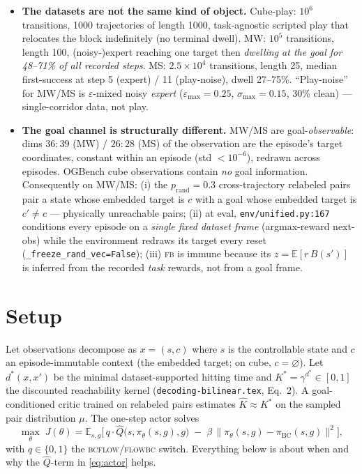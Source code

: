 \documentclass[10pt]{article}
\newcommand{\E}{\mathbb{E}}
\begin{document}
\begin{itemize}
  500k steps, P1-partial moves $0.37\to0.41$ while success moves $65\to93$.
\item[\textbf{E7}] \textbf{The datasets are not the same kind of object.}
  Cube-play: $10^6$ transitions, 1000 trajectories of length 1000, task-agnostic scripted
  play that relocates the block indefinitely (no terminal dwell). MW: $10^5$ transitions,
  length 100, (noisy-)expert reaching one target then \emph{dwelling at the goal for
  48--71\% of all recorded steps}. MS: $2.5{\times}10^4$ transitions, length 25, median
  first-success at step 5 (expert) / 11 (play-noise), dwell 27--75\%. ``Play-noise'' for
  MW/MS is $\varepsilon$-mixed noisy \emph{expert} ($\varepsilon_{\max}=0.25$,
  $\sigma_{\max}=0.15$, 30\% clean) --- single-corridor data, not play.
\item[\textbf{E8}] \textbf{The goal channel is structurally different.} MW/MS are
  goal-\emph{observable}: dims $36{:}39$ (MW) / $26{:}28$ (MS) of the observation are the
  episode's target coordinates, constant within an episode (std $<10^{-6}$), redrawn across
  episodes. OGBench cube observations contain \emph{no} goal information. Consequently on
  MW/MS: (i) the $p_{\mathrm{rand}}=0.3$ cross-trajectory relabeled pairs pair a state whose
  embedded target is $c$ with a goal whose embedded target is $c'\ne c$ --- physically
  unreachable pairs; (ii) at eval, \texttt{env/unified.py:167} conditions every episode on
  a \emph{single fixed dataset frame} (argmax-reward next-obs) while the environment redraws
  its target every reset (\texttt{\_freeze\_rand\_vec=False}); (iii) \textsc{fb} is immune
  because its $z=\E[r\,B(s')]$ is inferred from the recorded \emph{task} rewards, not from a
  goal frame.
\end{itemize}

\section{Setup}

Let observations decompose as $x=(s,c)$ where $s$ is the controllable state and $c$ an
episode-immutable context (the embedded target; on cube, $c=\varnothing$). Let
$d^*(x,x')$ be the minimal dataset-supported hitting time and
$K^*=\gamma^{d^*}\in[0,1]$ the discounted reachability kernel
(\texttt{decoding-bilinear.tex}, Eq.~2). A goal-conditioned critic trained on relabeled
pairs estimates $\hat K\approx K^*$ on the sampled pair distribution $\mu$. The one-step
actor solves
\begin{equation}
\max_\theta\; J(\theta)=\E_{s,g}\Big[\,q\cdot \hat Q\big(s,\pi_\theta(s,g),g\big)\;-\;
\beta\,\|\pi_\theta(s,g)-\pi_{\mathrm{BC}}(s,g)\|^2\Big],
\label{eq:actor}
\end{equation}
with $q\in\{0,1\}$ the \textsc{bcflow}/\textsc{flowbc} switch. Everything below is about
when and why the $\hat Q$-term in \eqref{eq:actor} helps.
\end{document}
